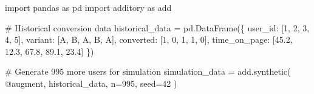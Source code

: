 \documentclass[
  letterpaper,
]{scrbook}
\newenvironment{Shaded}{\begin{snugshade}}{\end{snugshade}}
\newcommand{\CommentTok}[1]{\textcolor[rgb]{0.37,0.37,0.37}{#1}}
\newcommand{\DecValTok}[1]{\textcolor[rgb]{0.68,0.00,0.00}{#1}}
\newcommand{\FloatTok}[1]{\textcolor[rgb]{0.68,0.00,0.00}{#1}}
\newcommand{\ImportTok}[1]{\textcolor[rgb]{0.00,0.46,0.62}{#1}}
\newcommand{\NormalTok}[1]{\textcolor[rgb]{0.00,0.23,0.31}{#1}}
\newcommand{\OperatorTok}[1]{\textcolor[rgb]{0.37,0.37,0.37}{#1}}
\newcommand{\StringTok}[1]{\textcolor[rgb]{0.13,0.47,0.30}{#1}}
\begin{document}
\begin{Shaded}
\begin{Highlighting}[]
\ImportTok{import}\NormalTok{ pandas }\ImportTok{as}\NormalTok{ pd}
\ImportTok{import}\NormalTok{ additory }\ImportTok{as}\NormalTok{ add}

\CommentTok{\# Historical conversion data}
\NormalTok{historical\_data }\OperatorTok{=}\NormalTok{ pd.DataFrame(\{}
    \StringTok{\textquotesingle{}user\_id\textquotesingle{}}\NormalTok{: [}\DecValTok{1}\NormalTok{, }\DecValTok{2}\NormalTok{, }\DecValTok{3}\NormalTok{, }\DecValTok{4}\NormalTok{, }\DecValTok{5}\NormalTok{],}
    \StringTok{\textquotesingle{}variant\textquotesingle{}}\NormalTok{: [}\StringTok{\textquotesingle{}A\textquotesingle{}}\NormalTok{, }\StringTok{\textquotesingle{}B\textquotesingle{}}\NormalTok{, }\StringTok{\textquotesingle{}A\textquotesingle{}}\NormalTok{, }\StringTok{\textquotesingle{}B\textquotesingle{}}\NormalTok{, }\StringTok{\textquotesingle{}A\textquotesingle{}}\NormalTok{],}
    \StringTok{\textquotesingle{}converted\textquotesingle{}}\NormalTok{: [}\DecValTok{1}\NormalTok{, }\DecValTok{0}\NormalTok{, }\DecValTok{1}\NormalTok{, }\DecValTok{1}\NormalTok{, }\DecValTok{0}\NormalTok{],}
    \StringTok{\textquotesingle{}time\_on\_page\textquotesingle{}}\NormalTok{: [}\FloatTok{45.2}\NormalTok{, }\FloatTok{12.3}\NormalTok{, }\FloatTok{67.8}\NormalTok{, }\FloatTok{89.1}\NormalTok{, }\FloatTok{23.4}\NormalTok{]}
\NormalTok{\})}

\CommentTok{\# Generate 995 more users for simulation}
\NormalTok{simulation\_data }\OperatorTok{=}\NormalTok{ add.synthetic(}
    \StringTok{\textquotesingle{}@augment\textquotesingle{}}\NormalTok{,}
\NormalTok{    historical\_data,}
\NormalTok{    n}\OperatorTok{=}\DecValTok{995}\NormalTok{,}
\NormalTok{    seed}\OperatorTok{=}\DecValTok{42}
\NormalTok{)}


\end{Highlighting}
\end{Shaded}
\end{document}
